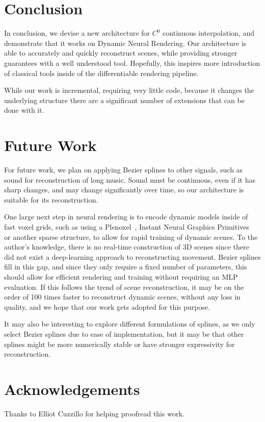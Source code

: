 \section*{Conclusion}

In conclusion, we devise a new architecture for $C^0$ continuous interpolation, and demonstrate
that it works on Dynamic Neural Rendering. Our architecture is able to accurately and quickly
reconstruct scenes, while providing stronger guarantees with a well understood tool.
Hopefully, this inspires more introduction of classical tools inside of the differentiable rendering pipeline.

While our work is incremental, requiring very little code, because it changes the underlying structure there are a significant number of extensions that can be done with it.

\section*{Future Work}

For future work, we plan on applying Bezier splines to other signals, such as sound for
reconstruction of long music. Sound must be continuous, even if it has sharp changes, and may change significantly over time, so our architecture is suitable for its reconstruction.

One large next step in neural rendering is to encode dynamic models inside of fast voxel grids, such as using a Plenoxel~\cite{yu2021plenoxels}, Instant Neural Graphics Primitives~\cite{mueller2022instant} or another sparse structure, to allow for rapid training of dynamic scenes. To the author's knowledge, there is no real-time construction of 3D scenes since there did not exist a deep-learning approach to reconstructing movement. Bezier splines fill in this gap, and since they only require a fixed number of parameters, this should allow for efficient rendering and training without requiring an MLP evaluation. If this follows the trend of scene reconstruction, it may be on the order of 100 times faster to reconstruct dynamic scenes, without any loss in quality, and we hope that our work gets adopted for this purpose.

It may also be interesting to explore different formulations of splines, as we only select
Bezier splines due to ease of implementation, but it may be that other splines might be more
numerically stable or have stronger expressivity for reconstruction.

\section*{Acknowledgements}

Thanks to Elliot Cuzzillo for helping proofread this work.